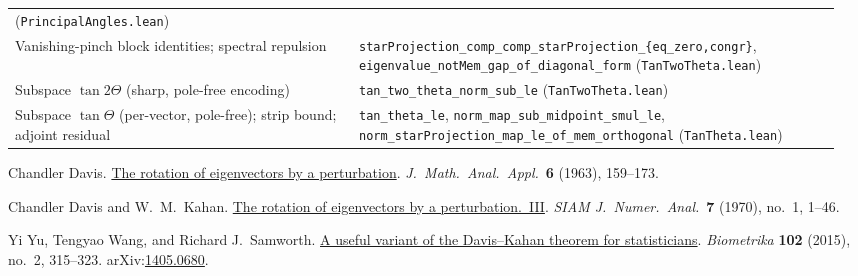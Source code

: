 \documentclass[11pt]{article}
\theoremstyle{remark}
\begin{document}
\begin{center}
\begin{tabular}{@{}p{0.40\linewidth}p{0.56\linewidth}@{}}
    (\texttt{PrincipalAngles.lean}) \\
Vanishing-pinch block identities; spectral repulsion
  & \texttt{starProjection\_comp\_comp\_starProjection\_\{eq\_zero,congr\}},
    \texttt{eigenvalue\_notMem\_gap\_of\_diagonal\_form}
    (\texttt{TanTwoTheta.lean}) \\
Subspace $\tan2\Theta$ (sharp, pole-free encoding)
  & \texttt{tan\_two\_theta\_norm\_sub\_le} (\texttt{TanTwoTheta.lean}) \\
Subspace $\tan\Theta$ (per-vector, pole-free); strip bound; adjoint residual
  & \texttt{tan\_theta\_le}, \texttt{norm\_map\_sub\_midpoint\_smul\_le},
    \texttt{norm\_starProjection\_map\_le\_of\_mem\_orthogonal}
    (\texttt{TanTheta.lean}) \\
\bottomrule
\end{tabular}
\end{center}

\begin{thebibliography}{9}
Chandler Davis.
\newblock \href{https://doi.org/10.1016/0022-247X(63)90001-5}{The rotation of eigenvectors by a perturbation}.
\newblock \emph{J.\ Math.\ Anal.\ Appl.}\ \textbf{6} (1963), 159--173.

Chandler Davis and W.\ M.\ Kahan.
\newblock \href{https://doi.org/10.1137/0707001}{The rotation of eigenvectors by a perturbation.\ III}.
\newblock \emph{SIAM J.\ Numer.\ Anal.}\ \textbf{7} (1970), no.\ 1, 1--46.

Yi Yu, Tengyao Wang, and Richard J.\ Samworth.
\newblock \href{https://doi.org/10.1093/biomet/asv008}{A useful variant of the Davis--Kahan theorem for statisticians}.
\newblock \emph{Biometrika} \textbf{102} (2015), no.\ 2, 315--323.
\newblock arXiv:\href{https://arxiv.org/abs/1405.0680}{1405.0680}.
\end{thebibliography}
\end{document}
